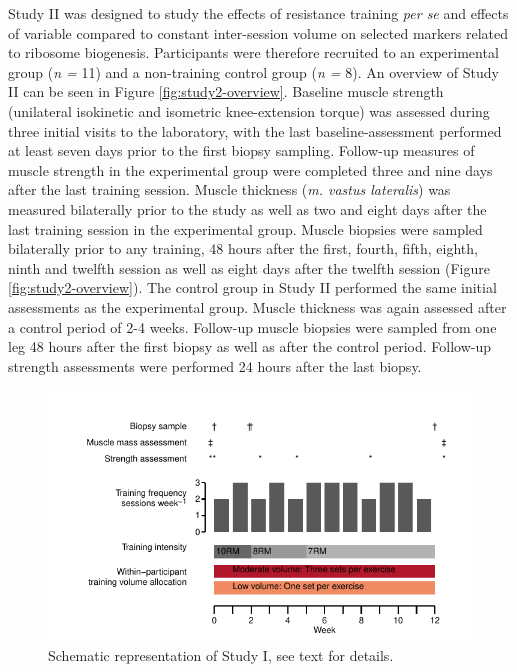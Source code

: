 \documentclass[twoside,10pt]{gihclass} %
\begin{document}
Study II was designed to study the effects of resistance training \emph{per se} and effects of variable compared to constant inter-session volume on selected markers related to ribosome biogenesis.
Participants were therefore recruited to an experimental group (\emph{n =} 11) and a non-training control group (\emph{n =} 8).
An overview of Study II can be seen in Figure \ref{fig:study2-overview}.
Baseline muscle strength (unilateral isokinetic and isometric knee-extension torque) was assessed during three initial visits to the laboratory, with the last baseline-assessment performed at least seven days prior to the first biopsy sampling. Follow-up measures of muscle strength in the experimental group were completed three and nine days after the last training session.
Muscle thickness (\emph{m. vastus lateralis}) was measured bilaterally prior to the study as well as two and eight days after the last training session in the experimental group.
Muscle biopsies were sampled bilaterally prior to any training, 48 hours after the first, fourth, fifth, eighth, ninth and twelfth session as well as eight days after the twelfth session (Figure \ref{fig:study2-overview}).
The control group in Study II performed the same initial assessments as the experimental group. Muscle thickness was again assessed after a control period of 2-4 weeks.
Follow-up muscle biopsies were sampled from one leg 48 hours after the first biopsy as well as after the control period. Follow-up strength assessments were performed 24 hours after the last biopsy.
\begin{figure}

{\centering \includegraphics{thesis_files/figure-latex/study1-overview-1} 

}

\caption[Study I, schematic overview]{Schematic representation of Study I, see text for details.  }\label{fig:study1-overview}
\end{figure}
\end{document}
